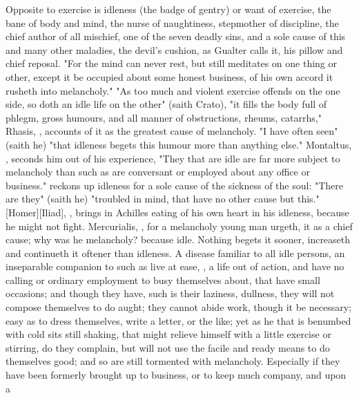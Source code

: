 Opposite to exercise is idleness (the badge of gentry) or want of exercise, the
bane of body and mind, the nurse of naughtiness, stepmother of discipline, the
chief author of all mischief, one of the seven deadly sins, and a sole cause of
this and many other maladies, the devil's cushion, as
Gualter calls it, his pillow and chief reposal. "For the
mind can never rest, but still meditates on one thing or other, except it be
occupied about some honest business, of his own accord it rusheth into
melancholy." "As too much and violent exercise offends on
the one side, so doth an idle life on the other" (saith Crato), "it fills the
body full of phlegm, gross humours, and all manner of obstructions, rheums,
catarrhs," \etc{} Rhasis, ,
accounts of it as the greatest cause of melancholy. "I
have often seen" (saith he) "that idleness begets this humour more than
anything else." Montaltus, , seconds him out of his
experience, "They that are idle are far more subject to
melancholy than such as are conversant or employed about any office or
business." \Plutarch{} reckons up idleness for a sole cause
of the sickness of the soul: "There are they" (saith he) "troubled in mind,
that have no other cause but this." [Homer][Iliad], ,
brings in Achilles eating of his own heart in his idleness, because he might
not fight. Mercurialis, , for a melancholy
young man urgeth, it as a chief cause; why was he
melancholy? because idle. Nothing begets it sooner, increaseth and continueth
it oftener than idleness. A disease familiar to all idle
persons, an inseparable companion to such as live at ease, , a life out of action, and have no calling or ordinary
employment to busy themselves about, that have small occasions; and though they
have, such is their laziness, dullness, they will not compose themselves to do
aught; they cannot abide work, though it be necessary; easy as to dress
themselves, write a letter, or the like; yet as he that is benumbed with cold
sits still shaking, that might relieve himself with a little exercise or
stirring, do they complain, but will not use the facile and ready means to do
themselves good; and so are still tormented with melancholy. Especially if they
have been formerly brought up to business, or to keep much company, and upon a
